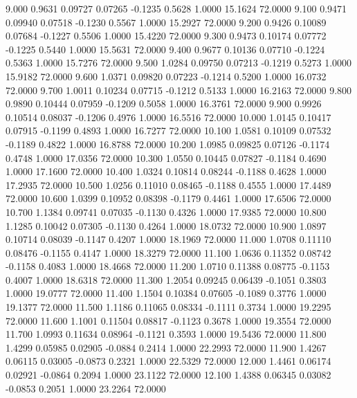    9.000   0.9631   0.09727   0.07265  -0.1235   0.5628   1.0000  15.1624  72.0000
   9.100   0.9471   0.09940   0.07518  -0.1230   0.5567   1.0000  15.2927  72.0000
   9.200   0.9426   0.10089   0.07684  -0.1227   0.5506   1.0000  15.4220  72.0000
   9.300   0.9473   0.10174   0.07772  -0.1225   0.5440   1.0000  15.5631  72.0000
   9.400   0.9677   0.10136   0.07710  -0.1224   0.5363   1.0000  15.7276  72.0000
   9.500   1.0284   0.09750   0.07213  -0.1219   0.5273   1.0000  15.9182  72.0000
   9.600   1.0371   0.09820   0.07223  -0.1214   0.5200   1.0000  16.0732  72.0000
   9.700   1.0011   0.10234   0.07715  -0.1212   0.5133   1.0000  16.2163  72.0000
   9.800   0.9890   0.10444   0.07959  -0.1209   0.5058   1.0000  16.3761  72.0000
   9.900   0.9926   0.10514   0.08037  -0.1206   0.4976   1.0000  16.5516  72.0000
  10.000   1.0145   0.10417   0.07915  -0.1199   0.4893   1.0000  16.7277  72.0000
  10.100   1.0581   0.10109   0.07532  -0.1189   0.4822   1.0000  16.8788  72.0000
  10.200   1.0985   0.09825   0.07126  -0.1174   0.4748   1.0000  17.0356  72.0000
  10.300   1.0550   0.10445   0.07827  -0.1184   0.4690   1.0000  17.1600  72.0000
  10.400   1.0324   0.10814   0.08244  -0.1188   0.4628   1.0000  17.2935  72.0000
  10.500   1.0256   0.11010   0.08465  -0.1188   0.4555   1.0000  17.4489  72.0000
  10.600   1.0399   0.10952   0.08398  -0.1179   0.4461   1.0000  17.6506  72.0000
  10.700   1.1384   0.09741   0.07035  -0.1130   0.4326   1.0000  17.9385  72.0000
  10.800   1.1285   0.10042   0.07305  -0.1130   0.4264   1.0000  18.0732  72.0000
  10.900   1.0897   0.10714   0.08039  -0.1147   0.4207   1.0000  18.1969  72.0000
  11.000   1.0708   0.11110   0.08476  -0.1155   0.4147   1.0000  18.3279  72.0000
  11.100   1.0636   0.11352   0.08742  -0.1158   0.4083   1.0000  18.4668  72.0000
  11.200   1.0710   0.11388   0.08775  -0.1153   0.4007   1.0000  18.6318  72.0000
  11.300   1.2054   0.09245   0.06439  -0.1051   0.3803   1.0000  19.0777  72.0000
  11.400   1.1504   0.10384   0.07605  -0.1089   0.3776   1.0000  19.1377  72.0000
  11.500   1.1186   0.11065   0.08334  -0.1111   0.3734   1.0000  19.2295  72.0000
  11.600   1.1001   0.11504   0.08817  -0.1123   0.3678   1.0000  19.3554  72.0000
  11.700   1.0993   0.11634   0.08964  -0.1121   0.3593   1.0000  19.5436  72.0000
  11.800   1.4299   0.05985   0.02905  -0.0884   0.2414   1.0000  22.2993  72.0000
  11.900   1.4267   0.06115   0.03005  -0.0873   0.2321   1.0000  22.5329  72.0000
  12.000   1.4461   0.06174   0.02921  -0.0864   0.2094   1.0000  23.1122  72.0000
  12.100   1.4388   0.06345   0.03082  -0.0853   0.2051   1.0000  23.2264  72.0000
